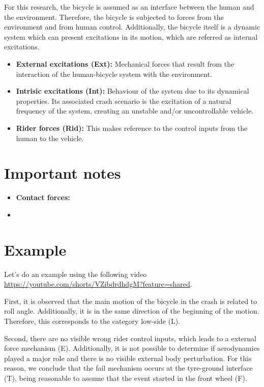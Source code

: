 \documentclass{article}
\begin{document}
For this research, the bicycle is assumed as an interface between the human and the environment.
%
Therefore, the bicycle is subjected to forces from the environment and from human control.
%
Additionally, the bicycle itself is a dynamic system which can present excitations in its motion, which are referred as internal excitations.


\begin{itemize}
    \item \textbf{External excitations (Ext):} Mechanical forces that result from the interaction of the human-bicycle system with the environment.
    \item \textbf{Intrisic excitations (Int):} Behaviour of the system due to its dynamical properties.
        Its associated crash scenario is the excitation of a natural frequency of the system, creating an unstable and/or uncontrollable vehicle.
    \item \textbf{Rider forces (Rid):} This makes reference to the control inputs from the human to the vehicle.
\end{itemize}

\section{Important notes}

\begin{itemize}

    \item \textbf{Contact forces:}
    \item 

\end{itemize}


\section{Example}

Let's do an example using the following video \url{https://youtube.com/shorts/VZibdrdhdgM?feature=shared}.

First, it is observed that the main motion of the bicycle in the crash is related to roll angle.
%
Additionally, it is in the same direction of the beginning of the motion.
%
Therefore, this corresponds to the category low-side (L).


Second, there are no visible wrong rider control inputs, which leads to a external force mechanism (E).
%
Additionally, it is not possible to determine if aerodynamics played a major role and there is no visible external body perturbation.
%
For this reason, we conclude that the fail mechanism occurs at the tyre-ground interface (T), being reasonable to assume that the event started in the front wheel (F).
\end{document}
